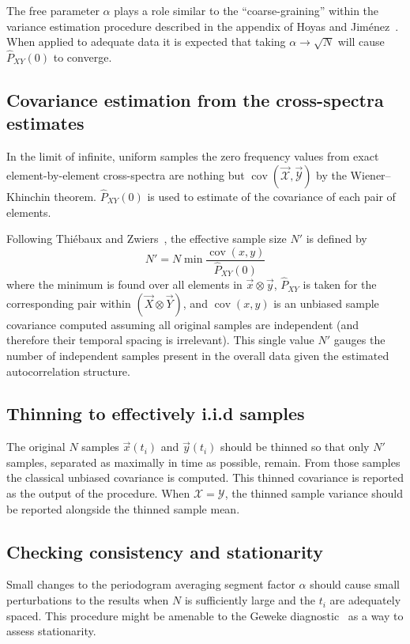 \documentclass[letterpaper,11pt,nointlimits,reqno]{amsart}
\DeclareMathOperator{\cov}{cov}
\begin{document}
The free parameter $\alpha$ plays a role similar to the ``coarse-graining''
within the variance estimation procedure described in the appendix of Hoyas and
Jim\'{e}nez~\cite{Hoyas2008Reynolds}.  When applied to adequate data it is
expected that taking $\alpha\to\sqrt{N}$ will cause $\hat{P}_{XY}(0)$ to
converge.

\subsection*{Covariance estimation from the cross-spectra estimates}

In the limit of infinite, uniform samples the zero frequency values from exact
element-by-element cross-spectra are nothing but $\cov\left( \vec{\mathscr{X}}
, \vec{\mathscr{Y}} \right)$ by the Wiener--Khinchin theorem.
$\hat{P}_{XY}(0)$ is used to estimate of the covariance of each pair of
elements.

Following Thi\'{e}baux and Zwiers~\cite{Thiebaux1984Interpretation},
the effective sample size $N'$ is defined by
$$
    N' = N \min \frac{\cov(x,y)} {\hat{P}_{XY}(0)}
$$
where the minimum is found over all elements in $\vec{x}\otimes\vec{y}$,
$\hat{P}_{XY}$ is taken for the corresponding pair within $\left(\vec{X}
\otimes \vec{Y} \right)$, and $\cov(x,y)$ is an unbiased sample covariance
computed assuming all original samples are independent (and therefore their
temporal spacing is irrelevant).  This single value $N'$ gauges the number of
independent samples present in the overall data given the estimated
autocorrelation structure.

\subsection*{Thinning to effectively i.i.d samples}

The original $N$ samples $\vec{x}(t_i)$ and $\vec{y}(t_i)$ should be thinned so
that only $N'$ samples, separated as maximally in time as possible, remain.
From those samples the classical unbiased covariance is computed.  This thinned
covariance is reported as the output of the procedure.  When
$\mathscr{X}=\mathscr{Y}$, the thinned sample variance should be reported
alongside the thinned sample mean.

\subsection*{Checking consistency and stationarity}

Small changes to the periodogram averaging segment factor $\alpha$ should cause
small perturbations to the results when $N$ is sufficiently large and the $t_i$
are adequately spaced.  This procedure might be amenable to the Geweke
diagnostic~\cite{Geweke1992Evaluating} as a way to assess stationarity.




\end{document}
